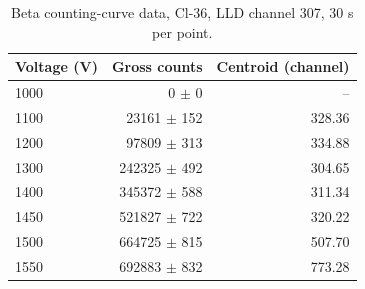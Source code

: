 \begin{table}[htbp]
\centering
\caption{Beta counting-curve data, Cl-36, LLD channel 307, 30 s per point.}
\label{tab:beta-raw}
\begin{tabular}{lrr}
\toprule
Voltage (V) & Gross counts & Centroid (channel) \\
\midrule
1000 & 0 $\pm$ 0 & -- \\
1100 & 23161 $\pm$ 152 & 328.36 \\
1200 & 97809 $\pm$ 313 & 334.88 \\
1300 & 242325 $\pm$ 492 & 304.65 \\
1400 & 345372 $\pm$ 588 & 311.34 \\
1450 & 521827 $\pm$ 722 & 320.22 \\
1500 & 664725 $\pm$ 815 & 507.70 \\
1550 & 692883 $\pm$ 832 & 773.28 \\
\bottomrule
\end{tabular}
\end{table}
